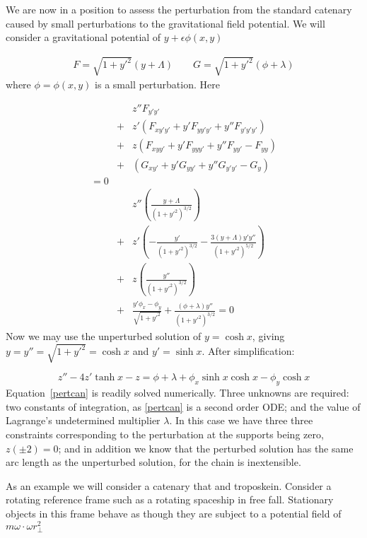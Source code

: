 \documentclass[pdflatex,sn-mathphys-num]{sn-jnl}%
\theoremstyle{thmstyleone}%
\theoremstyle{thmstyletwo}%
\theoremstyle{thmstylethree}%
\begin{document}
We are now in a position to assess the perturbation from the standard
catenary caused by small perturbations to the gravitational field
potential.  We will consider a gravitational potential of $y +
\epsilon\phi(x,y)$

\begin{eqnarray}\label{FandG}
F = \sqrt{1+y'^2}(y + \Lambda)\qquad G =  \sqrt{1+y'^2}(\phi + \lambda)
\end{eqnarray}
%
where $\phi=\phi(x,y)$ is a small perturbation.  Here 

\begin{eqnarray}
&{}& z''F_{y'y'}\nonumber\\
&+& z'(F_{xy'y'} + y'F_{yy'y'} + y''F_{y'y'y'})\nonumber\\
&+& z (F_{xyy'} + y'F_{yyy'} + y''F_{yy'}-F_{yy})\nonumber\\
&+& (G_{xy'} + y'G_{yy'} + y''G_{y'y'}- G_{y})\nonumber\\
= 0\\
&{}&  z''\left(\frac{y+\Lambda}{(1+y'^2)^{3/2}}\right)\nonumber\\
&+& z' \left(-\frac{y'}{(1+y'^2)^{3/2}} -\frac{3(y+\Lambda)y'y''}{(1+y'^2)^{5/2}}\right)\nonumber\\
&+& z  \left(\frac{y''}{(1+y'^2)^{3/2}}\right)\nonumber\\
&+& \frac{y'\phi_x-\phi_y}{\sqrt{1+y'^2}} + \frac{(\phi+\lambda)y''}{(1+y'^2)^{3/2}}=0
\end{eqnarray}
%
Now we may use the unperturbed solution of $y=\cosh x$, giving
$y=y''=\sqrt{1+y'^2}=\cosh x$ and $y'=\sinh x$.  After simplification:

\begin{equation}\label{pertcan}
  z'' - 4z'\tanh x - z =
  \phi + \lambda + \phi_x\sinh x\cosh x - \phi_y\cosh x
\end{equation}
%
Equation~\ref{pertcan} is readily solved numerically.  Three unknowns
are required: two constants of integration, as \ref{pertcan} is a
second order ODE; and the value of Lagrange's undetermined multiplier
$\lambda$.  In this case we have three three constraints corresponding
to the perturbation at the supports being zero, $z(\pm 2)=0$; and in
addition we know that the perturbed solution has the same arc length
as the unperturbed solution, for the chain is inextensible.

As an example we will consider a catenary that and troposkein.
Consider a rotating reference frame such as a rotating spaceship in
free fall.  Stationary objects in this frame behave as though they are
subject to a potential field of $m\omega\cdot\omega r_\perp^2$
\end{document}
